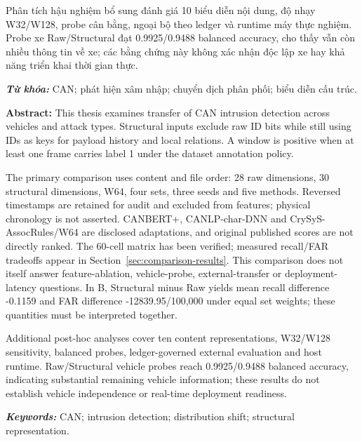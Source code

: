 \documentclass[12pt,a4paper,oneside,openany]{extbook}
\newcommand{\abstractchapter}[1]{\clearpage\phantomsection\addcontentsline{toc}{chapter}{#1}{\centering\fontsize{13}{13}\selectfont\bfseries\MakeUppercase{#1}\par}\vspace{12pt}}
\begin{document}
Phân tích hậu nghiệm bổ sung đánh giá 10 biểu diễn nội dung, độ nhạy W32/W128, probe cân bằng, ngoại bộ theo ledger và runtime máy thực nghiệm. Probe xe Raw/Structural đạt 0.9925/0.9488 balanced accuracy, cho thấy vẫn còn nhiều thông tin về xe; các bằng chứng này không xác nhận độc lập xe hay khả năng triển khai thời gian thực.

\noindent\textbf{\textit{Từ khóa:}} CAN; phát hiện xâm nhập; chuyển dịch phân phối; biểu diễn cấu trúc.
\par\endgroup

\abstractchapter{Abstract}

\begingroup\fontsize{12}{12}\selectfont
\noindent\textbf{Abstract:} This thesis examines transfer of CAN intrusion detection across vehicles and attack types. Structural inputs exclude raw ID bits while still using IDs as keys for payload history and local relations. A window is positive when at least one frame carries label 1 under the dataset annotation policy.

The primary comparison uses content and file order: 28 raw dimensions, 30 structural dimensions, W64, four sets, three seeds and five methods. Reversed timestamps are retained for audit and excluded from features; physical chronology is not asserted. CANBERT+, CANLP-char-DNN and CrySyS-AssocRules/W64 are disclosed adaptations, and original published scores are not directly ranked. The 60-cell matrix has been verified; measured recall/FAR tradeoffs appear in Section~\ref{sec:comparison-results}. This comparison does not itself answer feature-ablation, vehicle-probe, external-transfer or deployment-latency questions. In B, Structural minus Raw yields mean recall difference -0.1159 and FAR difference -12839.95/100,000 under equal set weights; these quantities must be interpreted together.

Additional post-hoc analyses cover ten content representations, W32/W128 sensitivity, balanced probes, ledger-governed external evaluation and host runtime. Raw/Structural vehicle probes reach 0.9925/0.9488 balanced accuracy, indicating substantial remaining vehicle information; these results do not establish vehicle independence or real-time deployment readiness.

\noindent\textbf{\textit{Keywords:}} CAN; intrusion detection; distribution shift; structural representation.
\par\endgroup
\end{document}
